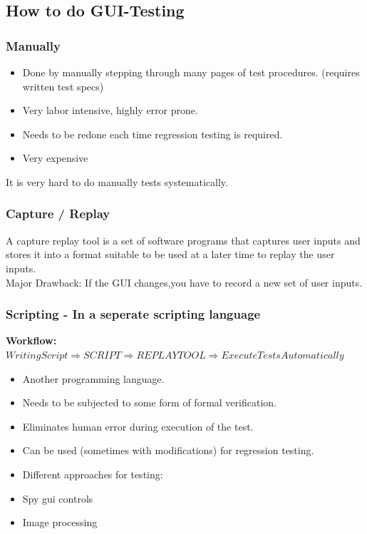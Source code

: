 \documentclass[a4paper,10pt]{article}
\newcommand{\Bold}[1]{\textbf{#1}} %
\begin{document}
\subsection{How to do GUI-Testing}
\subsubsection{Manually}
\begin{itemize}
\item Done by manually stepping through many pages of test procedures.
(requires written test specs)
\item Very labor intensive, highly error prone.
\item Needs to be redone each time regression testing is required.
\item Very expensive
\end{itemize}
It is very hard to do manually tests systematically.

\subsubsection{Capture / Replay}
A capture replay tool is a set of software programs that captures user inputs and stores it into a format suitable to be used at a later time to replay the user inputs.\\

Major Drawback: If the GUI changes,you have to record a new set of user inputs.

\subsubsection{Scripting - In a seperate scripting language}
\textbf{\Bold Workflow:} $Writing Script \Longrightarrow SCRIPT \Longrightarrow REPLAY TOOL \Longrightarrow Execute Tests Automatically$

\begin{itemize}
\item Another programming language.
\item Needs to be subjected to some form of formal verification.
\item Eliminates human error during execution of the test.
\item Can be used (sometimes with modifications) for regression testing.
\item Different approaches for testing:
\item Spy gui controls
\item Image processing
\end{itemize}
\end{document}
